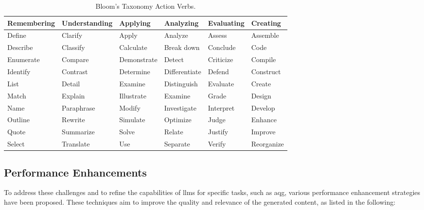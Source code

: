 \begin{table}[htbp]
   \centering
   \renewcommand{\arraystretch}{1.6}
   \caption{Bloom's Taxonomy Action Verbs.}
   \label{tab:blooms_verbs_columns}
   \begin{tabularx}{\textwidth}{|>{\hsize=1.15\hsize\centering\arraybackslash}X|>{\hsize=1.25\hsize\centering\arraybackslash}X|>{\hsize=0.95\hsize\centering\arraybackslash}X|>{\hsize=0.95\hsize\centering\arraybackslash}X|>{\hsize=0.9\hsize\centering\arraybackslash}X|>{\hsize=0.8\hsize\centering\arraybackslash}X|}
     \hline
     \rowcolor{gray!15}
     \textbf{Remembering} & \textbf{Understanding} & \textbf{Applying} & \textbf{Analyzing} & \textbf{Evaluating} & \textbf{Creating} \\
     \hline
     Define & Clarify & Apply & Analyze & Assess & Assemble \\
     \hline
     Describe & Classify & Calculate & Break down & Conclude & Code \\
     \hline
     Enumerate & Compare & Demonstrate & Detect & Criticize & Compile \\
     \hline
     Identify & Contrast & Determine & Differentiate & Defend & Construct \\
     \hline
     List & Detail & Examine & Distinguish & Evaluate & Create \\
     \hline
     Match & Explain & Illustrate & Examine & Grade & Design \\
     \hline
     Name & Paraphrase & Modify & Investigate & Interpret & Develop \\
     \hline
     Outline & Rewrite & Simulate & Optimize & Judge & Enhance \\
     \hline
     Quote & Summarize & Solve & Relate & Justify & Improve \\
     \hline
     Select & Translate & Use & Separate & Verify & Reorganize \\
     \hline
   \end{tabularx}
 \end{table}

\subsection{Performance Enhancements}
\label{sec:performance-enhancements}

To address these challenges and to refine the capabilities of \acp{llm} for specific tasks, such as \ac{aqg}, various performance enhancement strategies have been proposed. These techniques aim to improve the quality and relevance of the generated content, as listed in the following:


